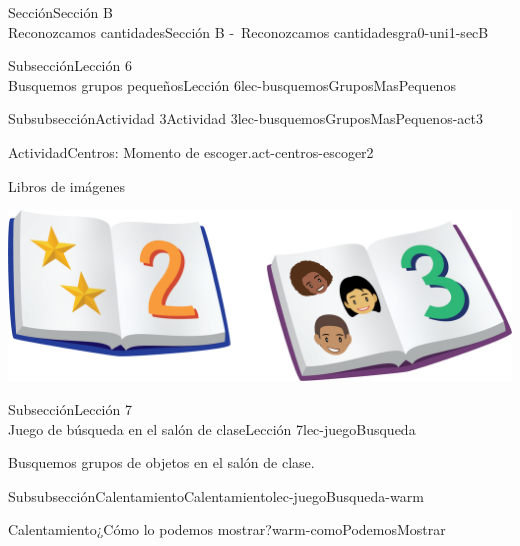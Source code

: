 \begin{sectionptx}{Sección}{{\Large Sección B\\}Reconozcamos cantidades}{}{Sección B -~Reconozcamos cantidades}{}{}{gra0-uni1-secB}
\begin{subsectionptx}{Subsección}{{\normalsize Lección 6\\[-0.05cm]}Busquemos grupos pequeños}{}{Lección 6}{}{}{lec-busquemosGruposMasPequenos}
\begin{subsubsectionptx}{Subsubsección}{Actividad 3}{}{Actividad 3}{}{}{lec-busquemosGruposMasPequenos-act3}
\begin{activity}{Actividad}{Centros: Momento de escoger.}{act-centros-escoger2}
\begin{sidebyside}{2}{0.025}{0.025}{0.05}
\begin{sbspanel}{0.45}
\end{sbspanel}%
\begin{sbspanel}{0.45}%
Libros de imágenes%
\par
\includegraphics[max width=\linewidth, center]{external/png-source/K.1.D Beta Student Workbooks.Books.png}
\end{sbspanel}%
\end{sidebyside}%
\end{activity}%
\end{subsubsectionptx}
\end{subsectionptx}
%
%
\typeout{************************************************}
\typeout{************************************************}
%
\begin{subsectionptx}{Subsección}{{\normalsize Lección 7\\[-0.05cm]}Juego de búsqueda en el salón de clase}{}{Lección 7}{}{}{lec-juegoBusqueda}
\begin{introduction}{}%
Busquemos grupos de objetos en el salón de clase.%
\end{introduction}%
%
%
\typeout{************************************************}
\typeout{************************************************}
%
\begin{subsubsectionptx}{Subsubsección}{Calentamiento}{}{Calentamiento}{}{}{lec-juegoBusqueda-warm}
\begin{exploration}{Calentamiento}{¿Cómo lo podemos mostrar?}{warm-comoPodemosMostrar}%
\begin{image}{0.0}{1}{0.0}{}%

\end{image}
\end{exploration}
\end{subsubsectionptx}
\end{subsectionptx}
\end{sectionptx}
